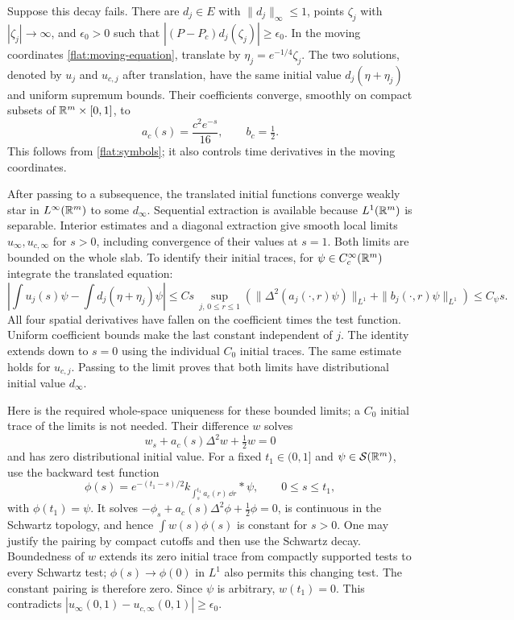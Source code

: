 Suppose this decay fails. There are $d_j\in E$ with
$\|d_j\|_\infty\le1$, points $\zeta_j$ with $|\zeta_j|\to\infty$,
and $\epsilon_0>0$ such that
$|(P-P_c)d_j(\zeta_j)|\ge\epsilon_0$.
In the moving coordinates \eqref{flat:moving-equation}, translate
by $\eta_j=e^{-1/4}\zeta_j$. The two solutions, denoted by
$u_j$ and $u_{c,j}$ after translation, have the same initial value
$d_j(\eta+\eta_j)$ and uniform supremum bounds. Their coefficients
converge, smoothly on compact subsets of
$\mathbb{R}^m\times[0,1]$, to
\[
 a_c(s)=\frac{c^2e^{-s}}{16},\qquad b_c=\tfrac12.
\]
This follows from \eqref{flat:symbols}; it also controls time
derivatives in the moving coordinates.

After passing to a subsequence, the translated initial functions
converge weakly star in $L^\infty(\mathbb{R}^m)$ to some $d_\infty$.
Sequential extraction is available because $L^1(\mathbb{R}^m)$ is separable.
Interior estimates and a diagonal extraction give smooth local
limits $u_\infty,u_{c,\infty}$ for $s>0$, including convergence of
their values at $s=1$. Both limits are bounded on the whole slab.
To identify their initial traces, for
$\psi\in C_c^\infty(\mathbb{R}^m)$ integrate the translated equation:
\begin{equation}\label{flat:translated-trace}
 \left|\int u_j(s)\psi
       -\int d_j(\eta+\eta_j)\psi\right|
 \le Cs\,
 \sup_{j,\,0\le r\le1}
 \left(\|\Delta^2(a_j(\cdot,r)\psi)\|_{L^1}
                    +\|b_j(\cdot,r)\psi\|_{L^1}\right)
 \le C_\psi s.
\end{equation}
All four spatial derivatives have fallen on the coefficient times
the test function. Uniform coefficient bounds make the last
constant independent of $j$. The identity extends down to $s=0$
using the individual $C_0$ initial traces. The same estimate holds
for $u_{c,j}$. Passing to the limit proves that both limits have
distributional initial value $d_\infty$.

Here is the required whole-space uniqueness for these bounded
limits; a $C_0$ initial trace of the limits is not needed.
Their difference $w$ solves
\[
 w_s+a_c(s)\Delta^2w+\tfrac12w=0
\]
and has zero distributional initial value. For a fixed $t_1\in(0,1]$
and $\psi\in\mathcal S(\mathbb{R}^m)$, use the backward test function
\[
 \phi(s)=e^{-(t_1-s)/2}
       k_{\int_s^{t_1}a_c(r)\,\dd r}*\psi,
 \qquad 0\le s\le t_1,
\]
with $\phi(t_1)=\psi$. It solves
$-\phi_s+a_c(s)\Delta^2\phi+\tfrac12\phi=0$, is continuous in the
Schwartz topology, and hence $\int w(s)\phi(s)$ is constant for
$s>0$. One may justify the pairing by compact cutoffs and then use
the Schwartz decay. Boundedness of $w$ extends its zero initial
trace from compactly supported tests to every Schwartz test;
$\phi(s)\to\phi(0)$ in $L^1$ also permits this changing test.
The constant pairing is therefore zero. Since $\psi$ is arbitrary,
$w(t_1)=0$. This contradicts
$|u_\infty(0,1)-u_{c,\infty}(0,1)|\ge\epsilon_0$.

